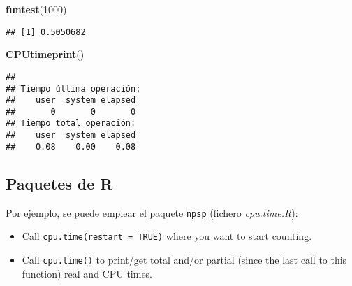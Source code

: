\documentclass[
]{book}
\newenvironment{Shaded}{\begin{snugshade}}{\end{snugshade}}
\newcommand{\DecValTok}[1]{\textcolor[rgb]{0.00,0.00,0.81}{#1}}
\newcommand{\KeywordTok}[1]{\textcolor[rgb]{0.13,0.29,0.53}{\textbf{#1}}}
\newcommand{\NormalTok}[1]{#1}
\theoremstyle{break}
\theoremstyle{definition}
\theoremstyle{definition}
\theoremstyle{definition}
\theoremstyle{remark}
\begin{document}
\begin{Shaded}
\begin{Highlighting}[]
\KeywordTok{funtest}\NormalTok{(}\DecValTok{1000}\NormalTok{)}
\end{Highlighting}
\end{Shaded}

\begin{verbatim}
## [1] 0.5050682
\end{verbatim}

\begin{Shaded}
\begin{Highlighting}[]
\KeywordTok{CPUtimeprint}\NormalTok{()}
\end{Highlighting}
\end{Shaded}

\begin{verbatim}
## 
## Tiempo última operación:
##    user  system elapsed 
##       0       0       0 
## Tiempo total operación:
##    user  system elapsed 
##    0.08    0.00    0.08
\end{verbatim}

\hypertarget{paquetes-de-r-1}{%
\subsection{Paquetes de R}\label{paquetes-de-r-1}}

Por ejemplo, se puede emplear el paquete \texttt{npsp} (fichero \emph{cpu.time.R}):

\begin{itemize}
\item
  Call \texttt{cpu.time(restart\ =\ TRUE)} where you want to start counting.
\item
  Call \texttt{cpu.time()} to print/get total and/or partial (since the last call
  to this function) real and CPU times.
\end{itemize}
\end{document}
